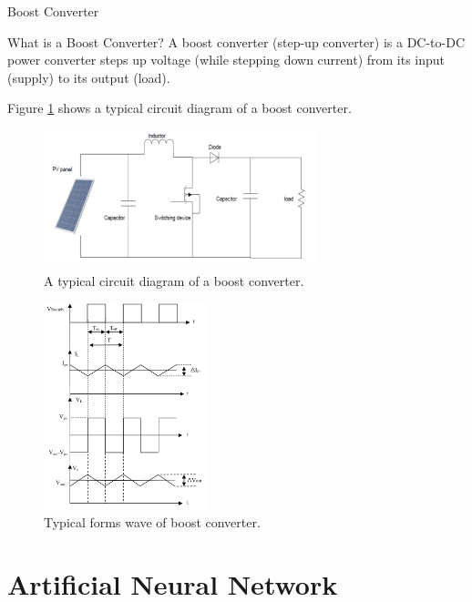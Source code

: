 \documentclass[10pt]{beamer}
\begin{document}
%
%
\begin{frame}[allowframebreaks]{Boost Converter}
\begin{alertblock}{What is a Boost Converter?}
A boost converter (step-up converter) is a DC-to-DC power converter steps up voltage (while stepping down current) from its input (supply) to its output (load).
\end{alertblock}

Figure \ref{fig:boostConvCkt} shows a typical circuit diagram of a boost converter.

\begin{figure}
	\centering
    \includegraphics[width=.6\linewidth, height=4cm]{boostconverter.png}
    \caption{A typical circuit diagram of a boost converter.}
    \label{fig:boostConvCkt}
\end{figure}


\framebreak 

\vspace{1cm}
\begin{figure}
	\centering
    \includegraphics[width=.6\linewidth, height=6cm]{boostconvertergraph.png}
    \caption{Typical forms wave of boost converter.}
    \label{fig:boostConvWave}
\end{figure}

\end{frame}

\section{Artificial Neural Network}
\end{document}
